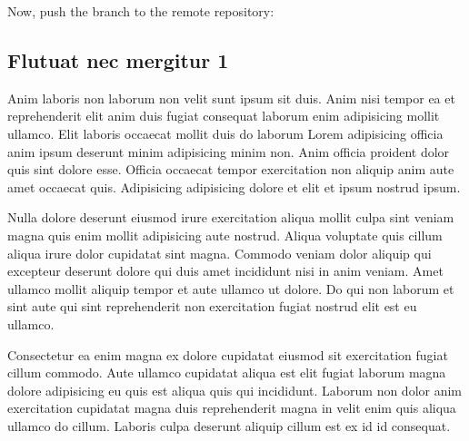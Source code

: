 \documentclass[a4paper,10pt,french]{sphinxmanual}
\begin{document}
\begin{sphinxVerbatim}[commandchars=\\\{\}]
  
   
\end{sphinxVerbatim}

Now, push the  branch to the remote repository:

\begin{sphinxVerbatim}[commandchars=\\\{\}]
   
\end{sphinxVerbatim}


\subsection{Flutuat nec mergitur 1}
\label{\detokenize{docs/tuts/autocad-tut01:flutuat-nec-mergitur-1}}
Anim laboris non laborum non velit sunt ipsum sit duis. Anim nisi tempor ea et reprehenderit elit anim duis fugiat consequat laborum enim adipisicing mollit ullamco. Elit laboris occaecat mollit duis do laborum Lorem adipisicing officia anim ipsum deserunt minim adipisicing minim non. Anim officia proident dolor quis sint dolore esse. Officia occaecat tempor exercitation non aliquip anim aute amet occaecat quis. Adipisicing adipisicing dolore et elit et ipsum nostrud ipsum.

Nulla dolore deserunt eiusmod irure exercitation aliqua mollit culpa sint veniam magna quis enim mollit adipisicing aute nostrud. Aliqua voluptate quis cillum aliqua irure dolor cupidatat sint magna. Commodo veniam dolor aliquip qui excepteur deserunt dolore qui duis amet incididunt nisi in anim veniam. Amet ullamco mollit aliquip tempor et aute ullamco ut dolore. Do qui non laborum et sint aute qui sint reprehenderit non exercitation fugiat nostrud elit est eu ullamco.

Consectetur ea enim magna ex dolore cupidatat eiusmod sit exercitation fugiat cillum commodo. Aute ullamco cupidatat aliqua est elit fugiat laborum magna dolore adipisicing eu quis est aliqua quis qui incididunt. Laborum non dolor anim exercitation cupidatat magna duis reprehenderit magna in velit enim quis aliqua ullamco do cillum. Laboris culpa deserunt aliquip cillum est ex id id consequat.
\end{document}

